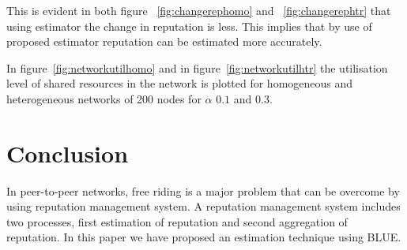 \documentclass{IEEEtran}
\begin{document}
This is evident in both figure ~\ref{fig:changerephomo} and ~\ref{fig:changerephtr} that using estimator the change in reputation is less. This implies that by use of proposed estimator reputation can be estimated more accurately. 

In figure~\ref{fig:networkutilhomo} and in figure~\ref{fig:networkutilhtr} the utilisation level of shared resources in the network is plotted for  homogeneous and heterogeneous networks of 200 nodes for $\alpha$ $0.1$ and $0.3$. 

\section{Conclusion}
In peer-to-peer networks, free riding is a major problem that can be overcome by using reputation management system. A reputation management system includes two processes, first estimation of reputation and second aggregation of reputation. In this paper we have proposed an estimation technique using BLUE. 
\end{document}
